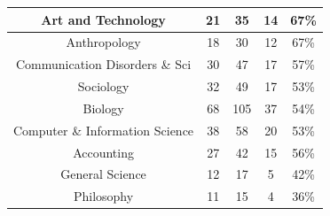 \documentclass[10]{article}
\begin{document}
\begin{longtable}[c]{|ccccc|}
	\multicolumn{1}{|c|}{Art and Technology}                         & \multicolumn{1}{c|}{21}                              & \multicolumn{1}{c|}{35}                                  & \multicolumn{1}{c|}{14}                 & 67\%                  \\ \hline
	\multicolumn{1}{|c|}{Anthropology}                               & \multicolumn{1}{c|}{18}                              & \multicolumn{1}{c|}{30}                                  & \multicolumn{1}{c|}{12}                 & 67\%                  \\ \hline
	\multicolumn{1}{|c|}{Communication Disorders \& Sci}             & \multicolumn{1}{c|}{30}                              & \multicolumn{1}{c|}{47}                                  & \multicolumn{1}{c|}{17}                 & 57\%                  \\ \hline
	\multicolumn{1}{|c|}{Sociology}                                  & \multicolumn{1}{c|}{32}                              & \multicolumn{1}{c|}{49}                                  & \multicolumn{1}{c|}{17}                 & 53\%                  \\ \hline
	\multicolumn{1}{|c|}{Biology}                                    & \multicolumn{1}{c|}{68}                              & \multicolumn{1}{c|}{105}                                 & \multicolumn{1}{c|}{37}                 & 54\%                  \\ \hline
	\multicolumn{1}{|c|}{Computer \& Information Science}            & \multicolumn{1}{c|}{38}                              & \multicolumn{1}{c|}{58}                                  & \multicolumn{1}{c|}{20}                 & 53\%                  \\ \hline
	\multicolumn{1}{|c|}{Accounting}                                 & \multicolumn{1}{c|}{27}                              & \multicolumn{1}{c|}{42}                                  & \multicolumn{1}{c|}{15}                 & 56\%                  \\ \hline
	\multicolumn{1}{|c|}{General Science}                            & \multicolumn{1}{c|}{12}                              & \multicolumn{1}{c|}{17}                                  & \multicolumn{1}{c|}{5}                  & 42\%                  \\ \hline
	\multicolumn{1}{|c|}{Philosophy}                                 & \multicolumn{1}{c|}{11}                              & \multicolumn{1}{c|}{15}                                  & \multicolumn{1}{c|}{4}                  & 36\%                  \\ \hline

\end{longtable}
\end{document}
